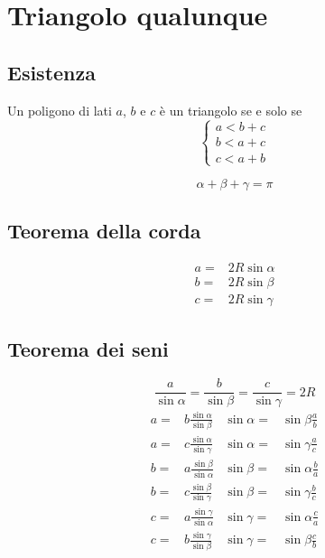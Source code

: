 \section{Triangolo qualunque}
\subsection{Esistenza}
Un poligono di lati $a$, $b$ e $c$ è un triangolo se e solo se
\[
\begin{cases}
a<b+c\\
b<a+c\\
c<a+b
\end{cases}
\]
\begin{center}
	
\end{center}
\begin{equation*}
\alpha+\beta+\gamma=\pi
\end{equation*}
\subsection{Teorema della corda}
\begin{align*}
a=&2R\sin\alpha\\
b=&2R\sin\beta\\
c=&2R\sin\gamma
\end{align*}
\subsection{Teorema dei seni}
\begin{equation*}
\dfrac{a}{\sin\alpha}=\dfrac{b}{\sin\beta}=\dfrac{c}{\sin\gamma}=2R
\end{equation*}
\begin{align*}
a=&b\frac{\sin\alpha}{\sin\beta}&\sin\alpha=&\sin\beta\frac{a}{b}\\
a=&c\frac{\sin\alpha}{\sin\gamma}&\sin\alpha=&\sin\gamma\frac{a}{c}\\
b=&a\frac{\sin\beta}{\sin\alpha}&\sin\beta=&\sin\alpha\frac{b}{a}\\
b=&c\frac{\sin\beta}{\sin\gamma}&\sin\beta=&\sin\gamma\frac{b}{c}\\
c=&a\frac{\sin\gamma}{\sin\alpha}&\sin\gamma=&\sin\alpha\frac{c}{a}\\
c=&b\frac{\sin\gamma}{\sin\beta}&\sin\gamma=&\sin\beta\frac{c}{b}\\
\end{align*}
